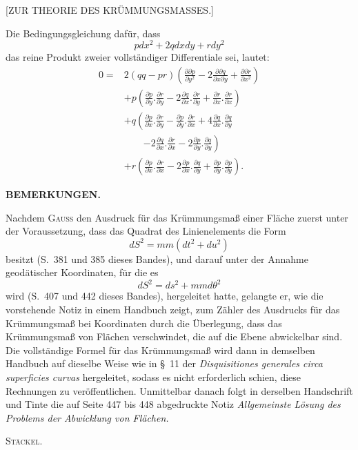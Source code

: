 \clearpage
{}
\begin{center}\large [ZUR THEORIE DES KRÜMMUNGSMASSES.]\end{center}
\noindent\hspace*{1.2em}Die Bedingungsgleichung dafür, dass
\[
pdx^2+2qdxdy+rdy^2
\]
\noindent das reine Produkt zweier vollständiger Differentiale sei, lautet:
\[
\begin{aligned}
0={}&2(qq-pr)\left(\frac{\partial\partial p}{\partial y^2}
-2\frac{\partial\partial q}{\partial x\partial y}
+\frac{\partial\partial r}{\partial x^2}\right)\\
&+p\left(\frac{\partial p}{\partial y}.\frac{\partial r}{\partial y}
-2\frac{\partial q}{\partial x}.\frac{\partial r}{\partial y}
+\frac{\partial r}{\partial x}.\frac{\partial r}{\partial x}\right)\\
&+q\left(\frac{\partial p}{\partial x}.\frac{\partial r}{\partial y}
-\frac{\partial p}{\partial y}.\frac{\partial r}{\partial x}
+4\frac{\partial q}{\partial x}.\frac{\partial q}{\partial y}\right.\\
&\qquad\left.-2\frac{\partial q}{\partial x}.\frac{\partial r}{\partial x}
-2\frac{\partial p}{\partial y}.\frac{\partial q}{\partial y}\right)\\
&+r\left(\frac{\partial p}{\partial x}.\frac{\partial r}{\partial x}
-2\frac{\partial p}{\partial x}.\frac{\partial q}{\partial y}
+\frac{\partial p}{\partial y}.\frac{\partial p}{\partial y}\right).
\end{aligned}
\]

\begin{center}\textbf{BEMERKUNGEN.}\end{center}
\noindent\hspace*{1.2em}Nachdem \textsc{Gauss} den Ausdruck für das Krümmungsmaß einer Fläche zuerst unter der Voraussetzung, dass das Quadrat des Linienelements die Form
\[
dS^2=mm(dt^2+du^2)
\]
\noindent besitzt (S.\ 381 und 385 dieses Bandes), und darauf unter der Annahme geodätischer Koordinaten, für die es
\[
dS^2=ds^2+mmd\theta^2
\]
\noindent wird (S.\ 407 und 442 dieses Bandes), hergeleitet hatte, gelangte er, wie die vorstehende Notiz in einem Handbuch zeigt, zum Zähler des Ausdrucks für das Krümmungsmaß bei  Koordinaten durch die Überlegung, dass das Krümmungsmaß von Flächen verschwindet, die auf die Ebene abwickelbar sind. Die vollständige Formel für das Krümmungsmaß wird dann in demselben Handbuch auf dieselbe Weise wie in \S\ 11 der \textit{Disquisitiones generales circa superficies curvas} hergeleitet, sodass es nicht erforderlich schien, diese Rechnungen zu veröffentlichen. Unmittelbar danach folgt in derselben Handschrift und Tinte die auf Seite 447 bis 448 abgedruckte Notiz \textit{Allgemeinste Lösung des Problems der Abwicklung von Flächen.}
\begin{flushright}\textsc{Stäckel}.\end{flushright}

